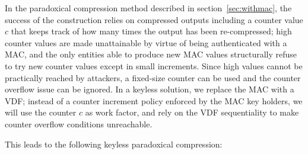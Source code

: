 \documentclass{llncs}
\begin{document}
In the paradoxical compression method described in
section~\ref{sec:withmac}, the success of the construction relies on
compressed outputs including a counter value $c$ that keeps track of how
many times the output has been re-compressed; high counter values are
made unattainable by virtue of being authenticated with a MAC, and the
only entities able to produce new MAC values structurally refuse to try
new counter values except in small increments. Since high values cannot
be practically reached by attackers, a fixed-size counter can be used
and the counter overflow issue can be ignored. In a keyless solution, we
replace the MAC with a VDF; instead of a counter increment policy
enforced by the MAC key holders, we will use the counter $c$ as work
factor, and rely on the VDF sequentiality to make counter overflow
conditions unreachable.

This leads to the following keyless paradoxical compression:
\end{document}
